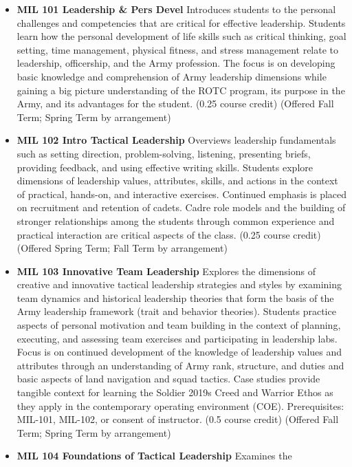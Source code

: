 \documentclass[
  letterpaper,
]{scrbook}
\providecommand{\tightlist}{%
  \setlength{\itemsep}{0pt}\setlength{\parskip}{0pt}}
\begin{document}
\begin{itemize}
\tightlist
\item
  \textbf{MIL 101 Leadership \& Pers Devel} Introduces students to the
  personal challenges and competencies that are critical for effective
  leadership. Students learn how the personal development of life skills
  such as critical thinking, goal setting, time management, physical
  fitness, and stress management relate to leadership, officership, and
  the Army profession. The focus is on developing basic knowledge and
  comprehension of Army leadership dimensions while gaining a big
  picture understanding of the ROTC program, its purpose in the Army,
  and its advantages for the student. (0.25 course credit) (Offered Fall
  Term; Spring Term by arrangement)
\item
  \textbf{MIL 102 Intro Tactical Leadership} Overviews leadership
  fundamentals such as setting direction, problem-solving, listening,
  presenting briefs, providing feedback, and using effective writing
  skills. Students explore dimensions of leadership values, attributes,
  skills, and actions in the context of practical, hands-on, and
  interactive exercises. Continued emphasis is placed on recruitment and
  retention of cadets. Cadre role models and the building of stronger
  relationships among the students through common experience and
  practical interaction are critical aspects of the class. (0.25 course
  credit) (Offered Spring Term; Fall Term by arrangement)
\item
  \textbf{MIL 103 Innovative Team Leadership} Explores the dimensions of
  creative and innovative tactical leadership strategies and styles by
  examining team dynamics and historical leadership theories that form
  the basis of the Army leadership framework (trait and behavior
  theories). Students practice aspects of personal motivation and team
  building in the context of planning, executing, and assessing team
  exercises and participating in leadership labs. Focus is on continued
  development of the knowledge of leadership values and attributes
  through an understanding of Army rank, structure, and duties and basic
  aspects of land navigation and squad tactics. Case studies provide
  tangible context for learning the Soldier 2019s Creed and Warrior
  Ethos as they apply in the contemporary operating environment (COE).
  Prerequisites: MIL-101, MIL-102, or consent of instructor. (0.5 course
  credit) (Offered Fall Term; Spring Term by arrangement)
\item
  \textbf{MIL 104 Foundations of Tactical Leadership} Examines the

\end{itemize}
\end{document}

